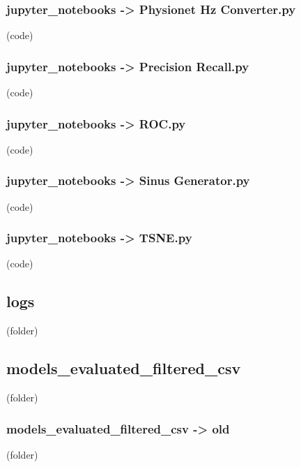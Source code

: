 \begin{myparindent}{0pt}

\noindent\subsubsection[Physionet Hz Converter.py]{jupyter\_notebooks -> Physionet Hz Converter.py} (code)

\noindent\subsubsection[Precision Recall.py]{jupyter\_notebooks -> Precision Recall.py} (code)

\noindent\subsubsection[ROC.py]{jupyter\_notebooks -> ROC.py} (code)

\noindent\subsubsection[Sinus Generator.py]{jupyter\_notebooks -> Sinus Generator.py} (code)

\noindent\subsubsection[TSNE.py]{jupyter\_notebooks -> TSNE.py} (code)

\noindent\subsection[logs]{logs} (folder)
\noindent\subsection[models\_evaluated\_filtered\_csv]{models\_evaluated\_filtered\_csv} (folder)
\noindent\subsubsection[old]{models\_evaluated\_filtered\_csv -> old} (folder)

\end{myparindent}
